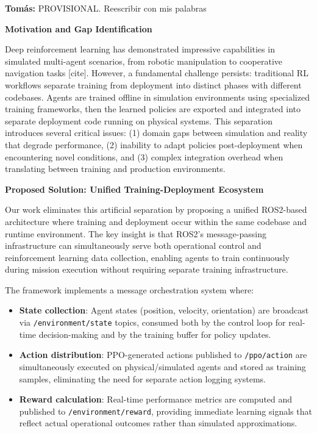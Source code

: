 \documentclass[preprint,3p]{elsarticle}
\newcommand{\tcom}[1]{{ \color{blue}\textbf{Tomás:} #1}}
\begin{document}
\vspace{0.5em}

\tcom{PROVISIONAL. Reescribir con mis palabras}

\vspace{0.5em}

\textbf{Motivation and Gap Identification}

Deep reinforcement learning has demonstrated impressive capabilities in simulated multi-agent scenarios, from robotic manipulation to cooperative navigation tasks [cite]. However, a fundamental challenge persists: traditional RL workflows separate training from deployment into distinct phases with different codebases. Agents are trained offline in simulation environments using specialized training frameworks, then the learned policies are exported and integrated into separate deployment code running on physical systems. This separation introduces several critical issues: (1) domain gaps between simulation and reality that degrade performance, (2) inability to adapt policies post-deployment when encountering novel conditions, and (3) complex integration overhead when translating between training and production environments.

\vspace{0.5em}

\textbf{Proposed Solution: Unified Training-Deployment Ecosystem}

Our work eliminates this artificial separation by proposing a unified ROS2-based architecture where training and deployment occur within the same codebase and runtime environment. The key insight is that ROS2's message-passing infrastructure can simultaneously serve both operational control and reinforcement learning data collection, enabling agents to train continuously during mission execution without requiring separate training infrastructure.

The framework implements a message orchestration system where:
\begin{itemize}
\item \textbf{State collection}: Agent states (position, velocity, orientation) are broadcast via \texttt{/environment/state} topics, consumed both by the control loop for real-time decision-making and by the training buffer for policy updates.

\item \textbf{Action distribution}: PPO-generated actions published to \texttt{/ppo/action} are simultaneously executed on physical/simulated agents and stored as training samples, eliminating the need for separate action logging systems.

\item \textbf{Reward calculation}: Real-time performance metrics are computed and published to \texttt{/environment/reward}, providing immediate learning signals that reflect actual operational outcomes rather than simulated approximations.
\end{itemize}
\end{document}
